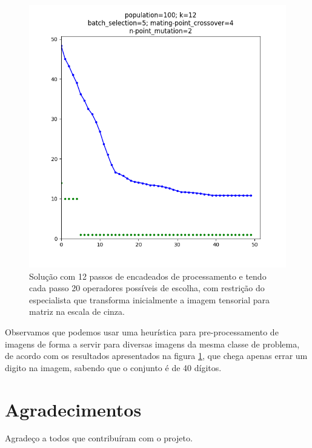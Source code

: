 \documentclass[fleqn,12pt]{SelfArx} %
\begin{document}
\begin{figure}[ht]\centering
\includegraphics[width=\linewidth]{./experiments/media_and_steps_12_op_20_step_50}
\caption{Solução com 12 passos de encadeados de processamento e tendo cada passo
20 operadores possíveis de escolha, com restrição do especialista que transforma
inicialmente a imagem tensorial para matriz na escala de cinza.}
\label{fig:media_and_steps_12_op_20_step_50}
\end{figure}


Observamos que podemos usar uma heurística para pre-processamento de imagens de
forma a servir para diversas imagens da mesma classe de problema, de acordo com
os resultados apresentados na figura \ref{fig:media_and_steps_12_op_20_step_50},
que chega apenas errar um digito na imagem, sabendo que o conjunto é de 40
dígitos.





\section*{Agradecimentos}


Agradeço a todos que contribuíram com o projeto.

{}

\printbibliography 
\end{document}
